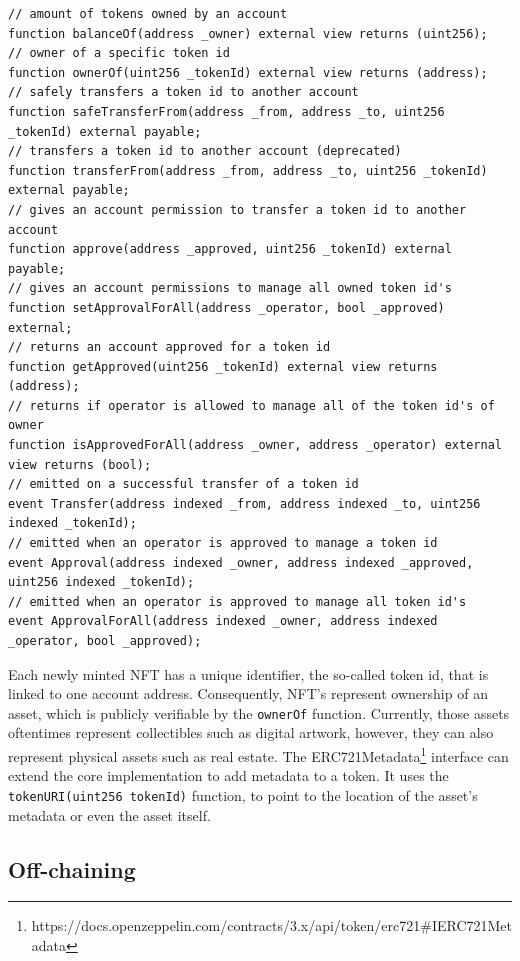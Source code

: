 \begin{lstlisting}[language=Solidity,caption={Core interface of an ERC-721 compliant token},label={lst:erc721-implementation}]
// amount of tokens owned by an account
function balanceOf(address _owner) external view returns (uint256);
// owner of a specific token id
function ownerOf(uint256 _tokenId) external view returns (address);
// safely transfers a token id to another account
function safeTransferFrom(address _from, address _to, uint256 _tokenId) external payable;
// transfers a token id to another account (deprecated)
function transferFrom(address _from, address _to, uint256 _tokenId) external payable;
// gives an account permission to transfer a token id to another account
function approve(address _approved, uint256 _tokenId) external payable;
// gives an account permissions to manage all owned token id's
function setApprovalForAll(address _operator, bool _approved) external;
// returns an account approved for a token id
function getApproved(uint256 _tokenId) external view returns (address);
// returns if operator is allowed to manage all of the token id's of owner 
function isApprovedForAll(address _owner, address _operator) external view returns (bool);
// emitted on a successful transfer of a token id
event Transfer(address indexed _from, address indexed _to, uint256 indexed _tokenId);
// emitted when an operator is approved to manage a token id
event Approval(address indexed _owner, address indexed _approved, uint256 indexed _tokenId);
// emitted when an operator is approved to manage all token id's
event ApprovalForAll(address indexed _owner, address indexed _operator, bool _approved);
\end{lstlisting}

Each newly minted NFT has a unique identifier, the so-called token id, that is linked to one account address. Consequently, NFT's represent ownership of an asset, which is publicly verifiable by the \texttt{ownerOf} function. Currently, those assets oftentimes represent collectibles such as digital artwork, however, they can also represent physical assets such as real estate. The ERC721Metadata\footnote{https://docs.openzeppelin.com/contracts/3.x/api/token/erc721\#IERC721Metadata} interface can extend the core implementation to add metadata to a token. It uses the \texttt{tokenURI(uint256 tokenId)} function, to point to the location of the asset's metadata or even the asset itself.

\subsection{Off-chaining}
\label{subsec:onoff}


